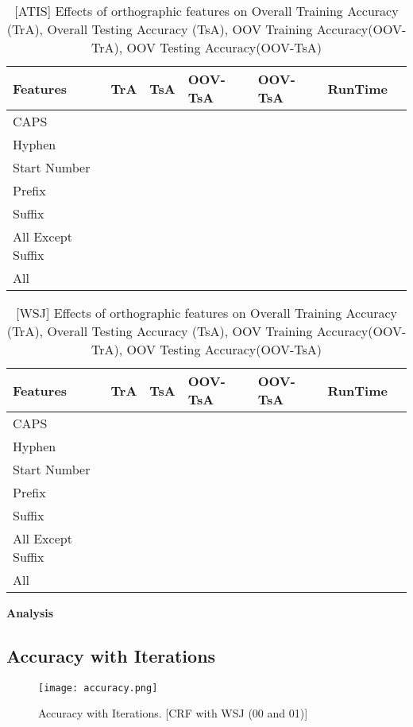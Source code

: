 \begin{center}	
	\begin{table}[ht]
  	\centering
   	\begin{tabular}{| l | l | l | l | l | l | l |}
    	\hline
        Features & TrA & TsA & OOV-TsA & OOV-TsA & RunTime \\ \hline
	CAPS & & & & & \\ \hline
	Hyphen & & & & & \\ \hline
	Start Number & & & & & \\ \hline
	Prefix & & & & & \\ \hline
	Suffix & & & & & \\ \hline
	All Except Suffix & & & & & \\ \hline
	All & & & & & \\ \hline
    	\end{tabular}
    	\caption{[ATIS] Effects of orthographic features on Overall Training Accuracy (TrA), Overall Testing Accuracy (TsA), OOV Training Accuracy(OOV-TrA), OOV Testing Accuracy(OOV-TsA)}
    	\end{table}%
\end{center}

\begin{center}	
	\begin{table}[ht]
  	\centering
   	\begin{tabular}{| l | l | l | l | l | l | l |}
    	\hline
        Features & TrA & TsA & OOV-TsA & OOV-TsA & RunTime \\ \hline
	CAPS & & & & & \\ \hline
	Hyphen & & & & & \\ \hline
	Start Number & & & & & \\ \hline
	Prefix & & & & & \\ \hline
	Suffix & & & & & \\ \hline
	All Except Suffix & & & & & \\ \hline
	All & & & & & \\ \hline
    	\end{tabular}
    	\caption{[WSJ] Effects of orthographic features on Overall Training Accuracy (TrA), Overall Testing Accuracy (TsA), OOV Training Accuracy(OOV-TrA), OOV Testing Accuracy(OOV-TsA)}
    	\end{table}%
\end{center}

{\bfseries Analysis}

\subsection {Accuracy with Iterations}

\begin{figure}[ht!]
\centering
\texttt{[image: accuracy.png]}
\caption{Accuracy with Iterations. [CRF with WSJ (00 and 01)]}
\label{accuracy}
\end{figure}




